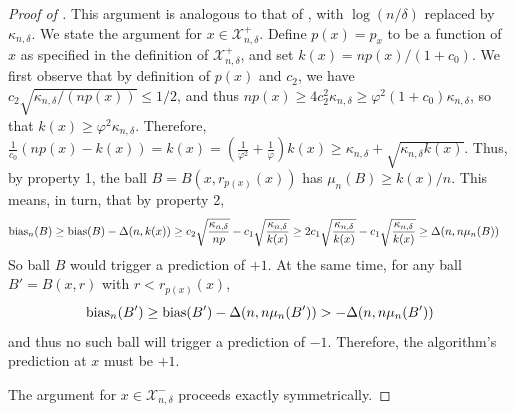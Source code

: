 \documentclass{article}
\def\X{{\mathcal X}}
\def\bias{{\rm bias}}
\begin{document}
\begin{proof}[Proof of ]
This argument is analogous to that of , with $\log (n/\delta)$ replaced by $\kappa_{n, \delta}$. We state the argument for $x \in \X^+_{n,\delta}$. Define $p(x) = p_x$ to be a function of $x$ as specified in the definition of $\X^+_{n,\delta}$, and set $k(x) = np(x) / (1 + c_0)$. We first observe that by definition of $p(x)$ and $c_2$, we have $c_2 \sqrt{\kappa_{n, \delta}/(n p(x))} \leq 1/2$, and thus $np(x) \geq 4 c_2^2 \kappa_{n, \delta} \geq \varphi^2 (1+c_0) \kappa_{n, \delta}$, so that $k(x) \geq \varphi^2 \kappa_{n, \delta}$. Therefore, $\frac{1}{c_0} (np(x) - k(x)) = k(x) = \left( \frac{1}{\varphi^2} + \frac{1}{\varphi} \right) k(x) \geq \kappa_{n, \delta} + \sqrt{ \kappa_{n, \delta} k(x) }$. Thus, by property 1, the ball $B = B(x, r_{p(x)} (x))$ has $\mu_n(B) \geq k(x)/n$. This means, in turn, that by property 2, 
\begin{align*}
\bias_n(B) &\geq \bias(B) - \Delta(n, k(x) ) 
\geq c_2 \sqrt{\frac{\kappa_{n, \delta}}{np}} - c_1 \sqrt{\frac{\kappa_{n, \delta}}{k(x)}} 
\geq 2c_1 \sqrt{\frac{\kappa_{n, \delta}}{k(x)}} - c_1 \sqrt{\frac{\kappa_{n, \delta}}{k(x)}} 
\geq \Delta(n, n \mu_n(B))
\end{align*}
So ball $B$ would trigger a prediction of $+1$.
At the same time, for any ball $B' = B(x, r)$ with $r < r_{p(x)} (x)$,
$$ \bias_n(B') \geq \bias(B') - \Delta(n, n \mu_n(B')) > -\Delta(n, n \mu_n(B')) $$
and thus no such ball will trigger a prediction of $-1$. Therefore, the algorithm's prediction at $x$ must be $+1$.

The argument for $x \in \X^-_{n,\delta}$ proceeds exactly symmetrically. 
\end{proof}
\end{document}
